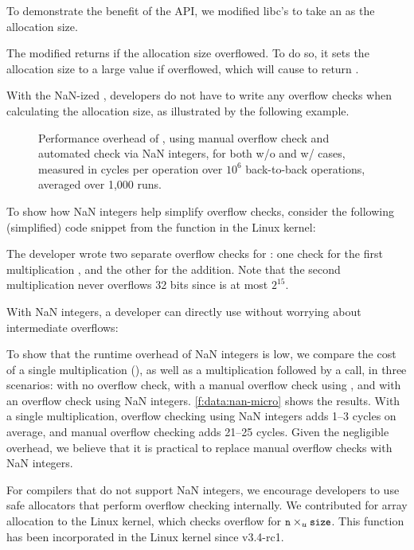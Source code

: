 To demonstrate the benefit of the API, we modified libc's 
to take an  as the allocation size.

The modified  returns  if the allocation size
overflowed.  To do so, it sets the allocation size to a large value
 if  overflowed, which will cause
 to return .

With the NaN-ized , developers do not have to write any overflow
checks when calculating the allocation size, as illustrated by the following
example.

%
\begin{figure}
\centering

\caption{Performance overhead of ,
using manual overflow check  and
automated check via NaN integers, for both w/o and w/ 
cases, measured in cycles per operation over $10^6$ back-to-back
operations, averaged over 1,000 runs.}
\label{f:data:nan-micro}
\end{figure}

To show how NaN integers help simplify overflow checks,
consider the following (simplified) code snippet from the
 function in the Linux kernel:
%

%
The developer wrote two separate overflow checks for
:
one check for the first multiplication , and
the other for the addition.
Note that the second multiplication 
never overflows 32 bits since  is at most $2^{15}$.

With NaN integers, a developer can directly use 
without worrying about intermediate overflows:
%

%
To show that the runtime overhead of NaN integers is low, we compare
the cost of a single multiplication (), as well as a multiplication
followed by a  call, in three scenarios: with no overflow
check, with a manual overflow check using
, and with an overflow check using
NaN integers.
%
\autoref{f:data:nan-micro} shows the results.
%
With a single multiplication, overflow checking using NaN integers
adds 1--3 cycles on average, and manual overflow checking adds
21--25 cycles.
%
Given the negligible overhead, we believe that it is practical
to replace manual overflow checks with NaN integers.

For compilers that do not support NaN integers, we encourage developers to use
safe allocators that perform overflow checking internally.  We contributed
 for array allocation to the Linux kernel, which
checks overflow for $\cc{n} \times_u \cc{size}$. This function has been
incorporated in the Linux kernel since v3.4-rc1.

